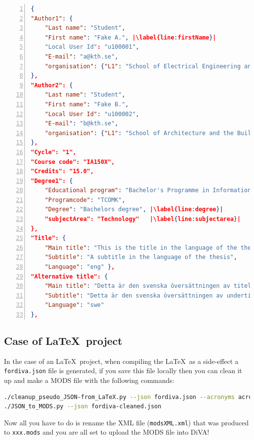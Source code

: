 \begin{lstlisting}[language=json, numbers=left,
    stepnumber=1, escapechar=|, caption={Text version of the top of the For DIVA output (reformatted to bring out the structure and improve readability - line numbers are added just in the listing)}, label=lst:forDIVAtop]
{
"Author1": {
    "Last name": "Student",
    "First name": "Fake A.", |\label{line:firstName}|
    "Local User Id": "u100001",
    "E-mail": "a@kth.se",
    "organisation": {"L1": "School of Electrical Engineering and Computer Science",}
},
"Author2": {
    "Last name": "Student",
    "First name": "Fake B.",
    "Local User Id": "u100002",
    "E-mail": "b@kth.se",
    "organisation": {"L1": "School of Architecture and the Built Environment",}
},
"Cycle": "1",
"Course code": "IA150X",
"Credits": "15.0",
"Degree1": {
    "Educational program": "Bachelor's Programme in Information and Communication Technology",
    "Programcode": "TCOMK",
    "Degree": "Bachelors degree", |\label{line:degree}|
    "subjectArea": "Technology"   |\label{line:subjectarea}|
},
"Title": {
    "Main title": "This is the title in the language of the thesis",
    "Subtitle": "A subtitle in the language of the thesis",
    "Language": "eng" },
"Alternative title": {
    "Main title": "Detta är den svenska översättningen av titeln",
    "Subtitle": "Detta är den svenska översättningen av undertiteln",
    "Language": "swe"
},
\end{lstlisting}

\subsection{Case of \LaTeX~project}
\label{sec:extractingJSONLaTeX}

In the case of an \LaTeX~project, when compiling the \LaTeX~as a side-effect a \texttt{fordiva.json} file is generated, if you save this file locally then you can clean it up and make a MODS file with the following commands:
\begin{lstlisting}[basicstyle=\footnotesize, language={bash}, caption={Cleanup pseudo JSON produced by the \LaTeX~compiler and then make a MODS file},label=lst:AdmincleanPseudoJSONandConvertToMODS]
./cleanup_pseudo_JSON-from_LaTeX.py --json fordiva.json --acronyms acronyms.tex
./JSON_to_MODS.py --json fordiva-cleaned.json
\end{lstlisting}

Now all you have to do is rename the XML file (\texttt{modsXML.xml}) that was produced to \texttt{xxx.mods} and you are all set to upload the MODS file into DiVA!


